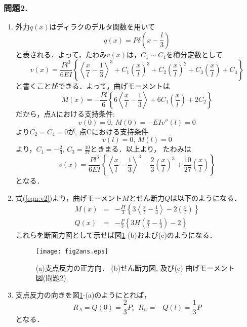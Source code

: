\documentclass[10pt,a4j]{jarticle}
\begin{document}
\subsubsection*{問題2. }
\begin{enumerate}
\item
外力$q(x)$はディラクのデルタ関数を用いて
\begin{equation}
	q(x)=P\delta \left(x-\frac{l}{3} \right)
	\label{eqn:qx_dlt}
\end{equation}
と表される．よって，たわみ$v(x)$は，$C_1\sim C_4$を積分定数として
\begin{equation}
	v(x)=\frac{Pl^3}{6EI}\left\{
			\left< \frac{x}{l} -\frac{1}{3}\right>^3
			+
			C_1\left(\frac{x}{l}\right)^3
			+
			C_2\left(\frac{x}{l}\right)^2
			+
			C_3\left(\frac{x}{l}\right)
			+
			C_4
		\right\}
		\label{eqn:gen_sol2}
\end{equation}
と書くことができる．よって，曲げモーメントは
\begin{equation}
	M(x)=-\frac{Pl}{6}\left\{
			6\left< \frac{x}{l} -\frac{1}{3}\right>
			+
			6C_1\left(\frac{x}{l}\right)
			+
			2C_2
		\right\}
\end{equation}
だから，点Aにおける支持条件:
\begin{equation}
	v(0)=0,\, M(0)=-EIv''(l)=0
\end{equation}
より$C_2=C_4=0$が, 点Cにおける支持条件
\begin{equation}
	v(l)=0,\, M(l)=0
\end{equation}
より，$C_1=-\frac{2}{3}, \, C_3=\frac{10}{27}$ときまる．以上より，
たわみは
\begin{equation}
	v(x)=\frac{Pl^3}{6EI}\left\{
			\left< \frac{x}{l} -\frac{1}{3}\right>^3
			-
			\frac{2}{3}\left(\frac{x}{l}\right)^3
			+
			\frac{10}{27}\left( \frac{x}{l} \right)
			\right\}
	\label{eqn:v2}
\end{equation}
となる．
\item
式(\ref{eqn:v2})より，曲げモーメント$M$とせん断力$Q$は以下のようになる．
\begin{eqnarray}
	M(x) &=& 
		-\frac{Pl}{3}
			\left\{
				3\left< \frac{x}{l} - \frac{1}{3}\right> 
				-2\left(\frac{x}{l}\right)
			\right\}
	\label{eqn:M2}
	\\
	Q(x) &=&
		-\frac{P}{3}
		\left\{
				3H\left(\frac{x}{l} -\frac{1}{3}\right)
				-
				2
		\right\}
	\label{eqn:Q2}
\end{eqnarray}
これらを断面力図として示せば図\ref{fig:fig2}-(b)および(c)のようになる．
\begin{figure}[h]
	\begin{center}
	\texttt{[image: fig2ans.eps]} 
	\end{center}
	\vspace{-5mm}
	\caption{(a)支点反力の正方向．
	(b)せん断力図, 及び(c) 曲げモーメント図(問題2).}
	\label{fig:fig2}
\end{figure}
\item
支点反力の向きを図\ref{fig:fig2}-(a)のようにとれば，
\begin{equation}
	R_A = Q(0) =  \frac{2}{3}P, \ \  
	R_C = -Q(l) =  \frac{1}{3}P
\end{equation}
となる．
\end{enumerate}
\end{document}
